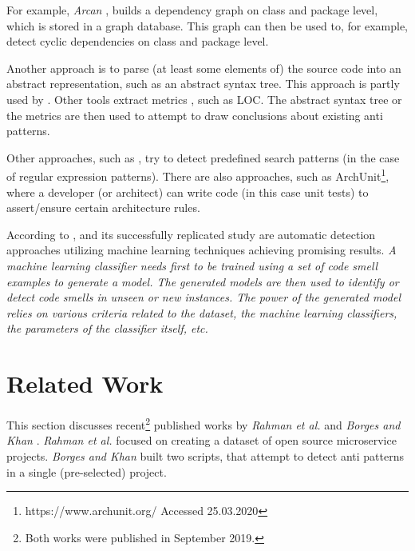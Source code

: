 \documentclass{article}
\begin{document}
For example, \textit{Arcan} \cite{fontana_arcan_2017, fontana_automatic_2016, biaggi_architectural_2018}, builds a dependency graph on class and package level, which is stored in a graph database. This graph can then be used to, for example, detect cyclic dependencies on class and package level. \newline

Another approach is to parse (at least some elements of) the source code into an abstract representation, such as an abstract syntax tree. This approach is partly used by \cite{imranur_curated_2019}. Other tools extract metrics \cite{fernandes_review-based_2016}, such as LOC. The abstract syntax tree or the metrics are then used to attempt to draw conclusions about existing anti patterns. \newline

Other approaches, such as \cite{borges_algorithm_2019}, try to detect predefined search patterns (in the case of \cite{borges_algorithm_2019} regular expression patterns). There are also approaches, such as ArchUnit\footnote{https://www.archunit.org/ Accessed 25.03.2020}, where a developer (or architect) can write code (in this case unit tests) to assert/ensure certain architecture rules. \newline

According to \cite{al-shaaby_bad_2020}, \cite{arcelli_fontana_comparing_2016} and its successfully replicated study \cite{di_nucci_detecting_2018} are automatic detection approaches utilizing machine learning techniques achieving promising results. \textit{A machine learning classifier needs first to be trained using a set of code smell examples to generate a model. The generated models are then used to identify or detect code smells in unseen or new instances. The power of the generated model relies on various criteria related to the dataset, the machine learning classifiers, the parameters of the classifier itself, etc.} \cite{al-shaaby_bad_2020}

\section{Related Work}
This section discusses recent\footnote{Both works were published in September 2019.} published works by \textit{Rahman et al.} \cite{imranur_curated_2019} and \textit{Borges and Khan} \cite{borges_algorithm_2019}. \textit{Rahman et al.} focused on creating a dataset of open source microservice projects. \textit{Borges and Khan} built two scripts, that attempt to detect anti patterns in a single (pre-selected) project.
\end{document}
